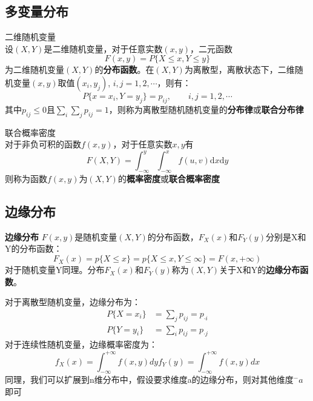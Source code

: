 \subsection{多变量分布}
\begin{definition}{二维随机变量\\}
    设$(X,Y)$是二维随机变量，对于任意实数$(x,y)$，二元函数$$F(x,y)=P\{ X\leq x, Y\leq y \}$$为二维随机变量$(X,Y)$的\textbf{分布函数}。在$(X,Y)$为离散型，离散状态下，二维随机变量$(x,y)$取值$(x_i,y_j)$, $i,j=1,2,\cdots$，则有：
    $$P\{x=x_i,Y=y_j\}=p_{ij},\qquad i,j=1,2,\cdots$$
    其中$p_{ij}\leq 0$且$\sum_i \sum_j p_{ij}=1$，则称为离散型随机随机变量的\textbf{分布律}或\textbf{联合分布律}
\end{definition}

\begin{definition}{联合概率密度\\}
    对于非负可积的函数$f(x,y)$，对于任意实数$x,y$有
    \begin{equation}
        F(X,Y)=\int_{-\infty}^{y}\int_{-\infty}^{x} f(u,v)\mathrm{d}x\mathrm{d}y
    \end{equation}
    则称为函数$f(x,y)$为$(X,Y)$的\textbf{概率密度}或\textbf{联合概率密度}
\end{definition}
\subsection{边缘分布}
\begin{definition}{\textbf{边缘分布}}
    $F(x,y)$是随机变量$(X,Y)$的分布函数，$F_X(x)$和$F_Y(y)$分别是X和Y的分布函数：
    \begin{equation}
        F_X(x)=p\{X\leq x\}=p\{X\leq x,Y\leq \infty\}=F(x,+\infty)
    \end{equation}
    对于随机变量Y同理。分布$F_X(x)$和$F_Y(y)$称为$(X,Y)$关于X和Y的\textbf{边缘分布函数}。
\end{definition}


对于离散型随机变量，边缘分布为：
\begin{equation}
    \begin{aligned}
        P\{X=x_i\}&=\sum_j p_{ij}=p_{\cdot i}\\
        P\{Y=y_i\}&=\sum_i p_{ij}=p_{\cdot j}
    \end{aligned}
\end{equation}
对于连续性随机变量，边缘概率密度为：
\begin{equation}
    f_X(x)=\int_{-\infty}^{+\infty}f(x,y)dy
    f_Y(y)=\int_{-\infty}^{+\infty}f(x,y)dx
\end{equation}
同理，我们可以扩展到n维分布中，假设要求维度a的边缘分布，则对其他维度$^- a$即可
